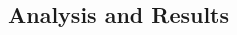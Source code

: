 \documentclass[10pt, letterpaper]{article}
\begin{document}
\begin{spacing}{1.0}
\section*{\large \bf Analysis and Results}











\end{spacing}
\end{document}
